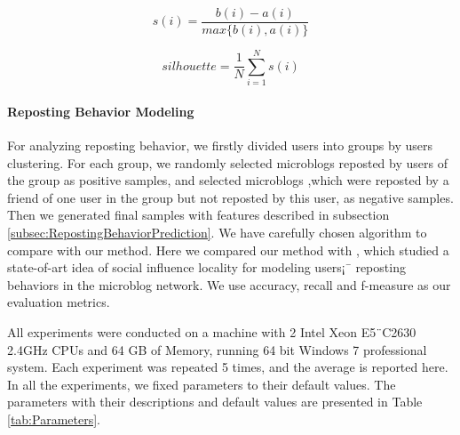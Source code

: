 \begin{equation}\label{silhouetteOfi}
s(i) = \frac{b(i)-a(i)}{max\{b(i),a(i)\}}
\end{equation}

\begin{equation}\label{silhouette}
silhouette = \frac{1}{N} \sum_{i=1}^{N} s(i)
\end{equation}

\paragraph{Reposting Behavior Modeling}
For analyzing reposting behavior, we firstly divided users into groups by users clustering. For each group, we randomly selected microblogs reposted by users of the group as positive samples, and selected microblogs ,which were reposted by a friend of one user in the group but not reposted by this user, as negative samples. Then we generated final samples with features described in subsection \ref{subsec:RepostingBehaviorPrediction}. We have carefully chosen algorithm to compare with our method. Here we compared our method with \cite{IEEEexample:conf/ijcai/ZhangLTCL13}, which studied a state-of-art idea of social influence locality for modeling users¡¯ reposting behaviors in the microblog network. We use accuracy, recall and f-measure as our evaluation metrics.\par

All experiments were conducted on a machine with 2 Intel Xeon E5¨C2630 2.4GHz CPUs and 64 GB of Memory, running 64 bit Windows 7 professional system. Each experiment was repeated 5 times, and the average is reported here. In all the experiments, we fixed parameters to their default values. The parameters with their descriptions and default values are presented in Table \ref{tab:Parameters}. \par

